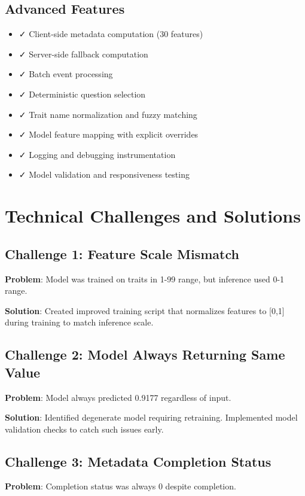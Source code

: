 \documentclass[11pt,a4paper]{article}
\begin{document}
\subsection{Advanced Features}
\begin{itemize}
    \item ✓ Client-side metadata computation (30 features)
    \item ✓ Server-side fallback computation
    \item ✓ Batch event processing
    \item ✓ Deterministic question selection
    \item ✓ Trait name normalization and fuzzy matching
    \item ✓ Model feature mapping with explicit overrides
    \item ✓ Logging and debugging instrumentation
    \item ✓ Model validation and responsiveness testing
\end{itemize}

\section{Technical Challenges and Solutions}

\subsection{Challenge 1: Feature Scale Mismatch}
\textbf{Problem}: Model was trained on traits in 1-99 range, but inference used 0-1 range.

\textbf{Solution}: Created improved training script that normalizes features to [0,1] during training to match inference scale.

\subsection{Challenge 2: Model Always Returning Same Value}
\textbf{Problem}: Model always predicted 0.9177 regardless of input.

\textbf{Solution}: Identified degenerate model requiring retraining. Implemented model validation checks to catch such issues early.

\subsection{Challenge 3: Metadata Completion Status}
\textbf{Problem}: Completion status was always 0 despite completion.
\end{document}
